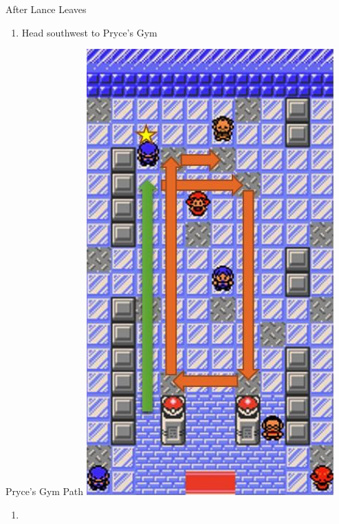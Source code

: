 \begin{paracol}{2}
\begin{menu}{After Lance Leaves}
	\varwb
	\begin{packMenu}
		\item \protein
		\item \escapeRope
	\end{packMenu}
	\varwe
\end{menu}

\begin{enumerate}[resume]
	\item Head southwest to Pryce's Gym
\end{enumerate}

\switchcolumn
\begin{story}{Pryce's Gym Path}
	\varwb
	\includegraphics[scale=0.4]{../Graphics/9. Pryce's Gym.png}
	\varwe
\end{story}

\switchcolumn*
\begin{enumerate}[resume]
	\item {}
\end{enumerate}


\end{paracol}

